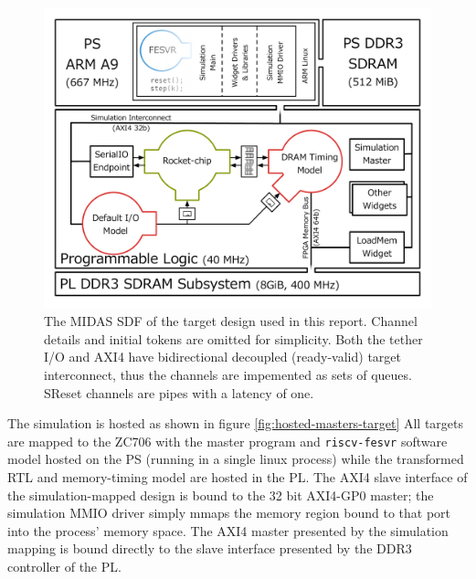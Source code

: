 \begin{figure}
	\centering
	\includegraphics[width=\textwidth]{figures/hosted-masters-target.pdf}
    \caption{The MIDAS SDF of the target design used in this report. Channel
    details and initial tokens are omitted for simplicity. Both the tether I/O
    and AXI4 have bidirectional decoupled (ready-valid) target interconnect,
    thus the channels are impemented as sets of queues. SReset channels are pipes with
    a latency of one.}
	\label{fig:hosted-default-target}
\end{figure}

The simulation is hosted as shown in figure \ref{fig:hosted-masters-target}
All targets are mapped to the ZC706 with the master program and
\texttt{riscv-fesvr} software model hosted on the PS (running in a single linux
process) while the transformed RTL and memory-timing model are hosted in the
PL. The AXI4 slave interface of the simulation-mapped design is bound to the 32
bit AXI4-GP0 master; the simulation MMIO driver simply mmaps the memory region
bound to that port into the process' memory space.  The AXI4 master presented
by the simulation mapping is bound directly to the slave interface presented by
the DDR3 controller of the PL.
